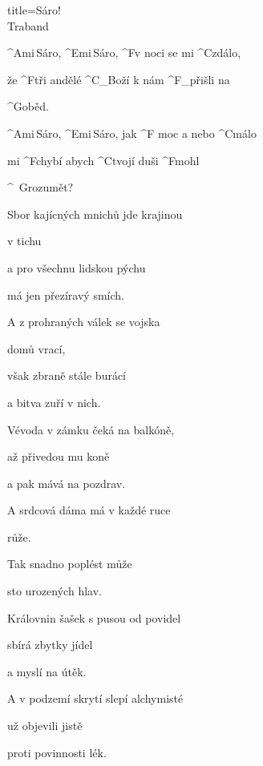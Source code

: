 \begin{song}{title=\predtitle\centering Sáro! \\\large Traband  \vspace*{-0.3cm}}  %
\begin{centerjustified}
\nejvetsi

\begin{varwidth}[t]{0.48\textwidth}\setlength{\parindent}{\pindent}  %
\sloka 
	^{Ami\,}Sáro, ^{Emi\,}Sáro, ^{F}v noci se mi ^{C\z}zdálo,

	že ^{F}tři andělé ^{C{\color{white}\_}}Boží k nám ^{F{\color{white}\_}}přišli na 

	^{G\z}oběd.

	^{Ami\,}Sáro, ^{Emi\,}Sáro, jak ^{F\,\,}moc a nebo ^{C\z}málo

	mi ^{F\z}chybí abych ^{C\z}tvojí duši ^{F\z}mohl 

	^{\,\,\,G}rozumět?

\sloka
	Sbor kajícných mnichů jde krajinou 
	
	v tichu
	
	a pro všechnu lidskou pýchu
	
	má jen přezíravý smích.

	A z prohraných válek se vojska 

	domů vrací,
	
	však zbraně stále burácí
	
	a bitva zuří v nich.

\sloka
	Vévoda v zámku čeká na balkóně,
	
	až přivedou mu koně
	
	a pak mává na pozdrav.
	
	A srdcová dáma má v každé ruce 

	růže.
	
	Tak snadno poplést může
	
	sto urozených hlav.

\sloka
	Královnin šašek s pusou od povidel
	
	sbírá zbytky jídel
	
	a myslí na útěk.
	
	A v podzemí skrytí slepí alchymisté
	
	už objevili jistě

	proti povinnosti lék.

\end{varwidth}\mezisloupci\begin{varwidth}[t]{0.48\textwidth}\setlength{\parindent}{\pindent}
\vspace*{0.405cm}  %


\end{varwidth}
\end{centerjustified}
\end{song}
